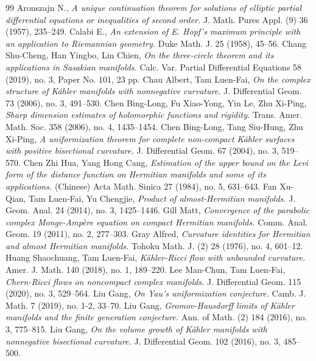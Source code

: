 \documentclass[12pt]{amsart}
\theoremstyle{definition}
\theoremstyle{remark}
\numberwithin{equation}{section}
\begin{document}
\begin{thebibliography}{99}
 Aronszajn N., {\sl A unique continuation theorem for solutions of elliptic partial differential equations or inequalities of second order.} J. Math. Pures Appl. (9) 36 (1957), 235--249.
Calabi E., {\sl An extension of E. Hopf's maximum principle with an application to Riemannian geometry.} Duke Math. J. 25 (1958), 45--56.
Chang Shu-Cheng, Han Yingbo, Lin Chien, {\sl On the three-circle theorem and its applications in Sasakian manifolds.} Calc. Var. Partial Differential Equations 58 (2019), no. 3, Paper No. 101, 23 pp.
 Chau Albert, Tam Luen-Fai, {\sl On the complex structure of K\'ahler manifolds with nonnegative curvature.} J. Differential Geom. 73 (2006), no. 3, 491--530.
 Chen Bing-Long, Fu Xiao-Yong, Yin Le, Zhu Xi-Ping, {\sl Sharp dimension estimates of holomorphic functions and rigidity.} Trans. Amer. Math. Soc. 358 (2006), no. 4, 1435--1454.
 Chen Bing-Long, Tang Siu-Hung, Zhu Xi-Ping, {\sl A uniformization theorem for complete non-compact K\"ahler surfaces with positive bisectional curvature.} J. Differential Geom. 67 (2004), no. 3, 519--570.
Chen Zhi Hua, Yang Hong Cang, {\sl Estimation of the upper bound on the Levi form of the distance function on Hermitian manifolds and some of its applications.} (Chinese) Acta Math. Sinica 27 (1984), no. 5, 631--643.
 Fan Xu-Qian, Tam Luen-Fai, Yu Chengjie, {\sl Product of almost-Hermitian manifolds.} J. Geom. Anal. 24 (2014), no. 3, 1425--1446.
Gill Matt, {\sl Convergence of the parabolic complex Monge-Amp\`{e}re equation on compact Hermitian manifolds.} Comm. Anal. Geom. 19 (2011), no. 2, 277--303.
 Gray Alfred,  {\sl Curvature identities for Hermitian and almost Hermitian manifolds.}  Tohoku Math. J. (2) 28 (1976), no. 4, 601--12.
 Huang Shaochuang, Tam Luen-Fai, {\sl  K\"ahler-Ricci flow with unbounded curvature.} Amer. J. Math. 140 (2018), no. 1, 189--220.
Lee Man-Chun, Tam Luen-Fai, {\sl  Chern-Ricci flows on noncompact complex manifolds.} J. Differential Geom. 115 (2020), no. 3, 529--564.
 Liu Gang, {\sl On Yau's uniformization conjecture.} Camb. J. Math. 7 (2019), no. 1-2, 33--70.
 Liu Gang, {\sl Gromov-Hausdorff limits of K\"ahler manifolds and the finite generation conjecture.} Ann. of Math. (2) 184 (2016), no. 3, 775--815.
 Liu Gang, {\sl On the volume growth of K\"ahler manifolds with nonnegative bisectional curvature.} J. Differential Geom. 102 (2016), no. 3, 485--500.

\end{thebibliography}
\end{document}
